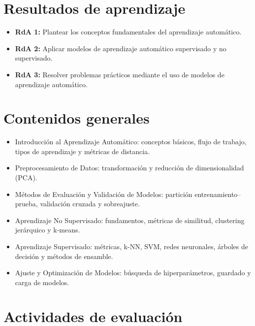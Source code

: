 \documentclass[a4,11pt]{aleph-notas}
\begin{document}
\addtolength{\headheight}{1.8\baselineskip}
\addtolength{\voffset}{-1.5\baselineskip}

\encabezado

\section{Resultados de aprendizaje} 

\begin{itemize}[leftmargin=*]
\item 
    \textbf{RdA 1:} Plantear los conceptos fundamentales del aprendizaje automático.
\item 
    \textbf{RdA 2:} Aplicar modelos de aprendizaje automático supervisado y no supervisado.
\item
    \textbf{RdA 3:} Resolver problemas prácticos mediante el uso de modelos de aprendizaje automático.
\end{itemize}

\section{Contenidos generales} 

\begin{itemize}
\item 
    Introducción al Aprendizaje Automático: conceptos básicos, flujo de trabajo, tipos de aprendizaje y métricas de distancia.
\item 
    Preprocesamiento de Datos: transformación y reducción de dimensionalidad (PCA).
\item 
    Métodos de Evaluación y Validación de Modelos: partición entrenamiento–prueba, validación cruzada y sobreajuste.
\item 
    Aprendizaje No Supervisado: fundamentos, métricas de similitud, clustering jerárquico y k-means.
\item 
    Aprendizaje Supervisado: métricas, k-NN, SVM, redes neuronales, árboles de decisión y métodos de ensamble.
\item 
    Ajuste y Optimización de Modelos: búsqueda de hiperparámetros, guardado y carga de modelos.
\end{itemize}


\section{Actividades de evaluación} 
\end{document}
